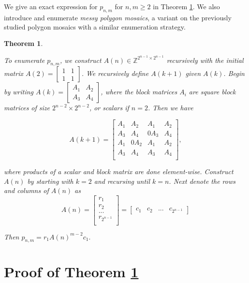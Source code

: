 \documentclass[12pt]{article}
\theoremstyle{plain}
\newtheorem{thm}{Theorem}
\theoremstyle{definition}
\theoremstyle{remark}
\theoremstyle{definition}
\begin{document}
We give an exact expression for $p_{n,m}$ for $n,m \geq 2$ in Theorem \ref{thm: main theorem}. We also introduce and enumerate \textit{messy polygon mosaics}, a variant on the previously studied polygon mosaics with a similar enumeration strategy.

\begin{thm}
\label{thm: main theorem}

To enumerate $p_{n,m}$, we construct $A(n) \in \mathbb{Z}^{2^{n-1} \times 2^{n-1}}$ recursively with the initial matrix $
A(2) = \begin{bmatrix}
1 & 1 \\
1 & 1
\end{bmatrix}
$. We recursively define $A(k+1)$ given $A(k)$. Begin by writing
$
A(k) = \begin{bmatrix}
A_1 & A_2 \\
A_3 & A_4
\end{bmatrix}
$, where the block matrices $A_i$ are square block matrices of size $2^{n-2} \times 2^{n-2}$, or scalars if $n=2$. Then we have

$$
A(k+1) = \begin{bmatrix}
A_1 & A_2 & A_1 & A_2 \\
A_3 & A_4 & 0A_3 & A_4 \\
A_1 & 0A_2 & A_1 & A_2 \\
A_3 & A_4 & A_3 & A_4 \\
\end{bmatrix},
$$

where products of a scalar and block matrix are done element-wise. Construct $A(n)$ by starting with $k=2$ and recursing until $k=n$. Next denote the rows and columns of $A(n)$ as
$$
A(n) = 
\begin{bmatrix}
    r_1 \\
    r_2 \\
    ... \\
    r_{2^{n-1}} \\
\end{bmatrix} = 
\begin{bmatrix}
    c_1 & c_2 & ... & c_{2^{n-1}}
\end{bmatrix}
$$

Then $p_{n,m} = r_1 A(n)^{m-2}c_1 .$
\end{thm}

\section{Proof of Theorem \ref{thm: main theorem}}
\end{document}
